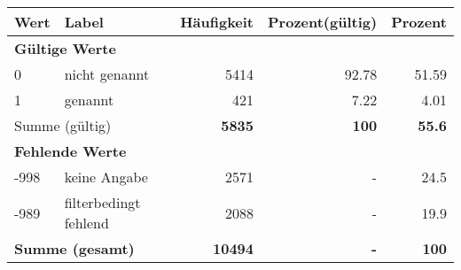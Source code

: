      \begin{longtable}{lXrrr}
     \toprule
     \textbf{Wert} & \textbf{Label} & \textbf{Häufigkeit} & \textbf{Prozent(gültig)} & \textbf{Prozent} \\
     \endhead
     \midrule
     \multicolumn{5}{l}{\textbf{Gültige Werte}}\\

     0 &
     \multicolumn{1}{X}{ nicht genannt   } &


       \num{5414} &
       \num[round-mode=places,round-precision=2]{92.78} &
         \num[round-mode=places,round-precision=2]{51.59} \\

     1 &
     \multicolumn{1}{X}{ genannt   } &


       \num{421} &
       \num[round-mode=places,round-precision=2]{7.22} &
         \num[round-mode=places,round-precision=2]{4.01} \\
     \midrule
     \multicolumn{2}{l}{Summe (gültig)} &
       \textbf{\num{5835}} &
     \textbf{\num{100}} &
       \textbf{\num[round-mode=places,round-precision=2]{55.6}} \\
     \multicolumn{5}{l}{\textbf{Fehlende Werte}}\\
       -998 &
       keine Angabe &
         \num{2571} &
        - &
         \num[round-mode=places,round-precision=2]{24.5} \\
       -989 &
       filterbedingt fehlend &
         \num{2088} &
        - &
         \num[round-mode=places,round-precision=2]{19.9} \\
     \midrule
     \multicolumn{2}{l}{\textbf{Summe (gesamt)}} &
          \textbf{\num{10494}} &
        \textbf{-} &
        \textbf{\num{100}} \\
     \bottomrule
     \end{longtable}
     
